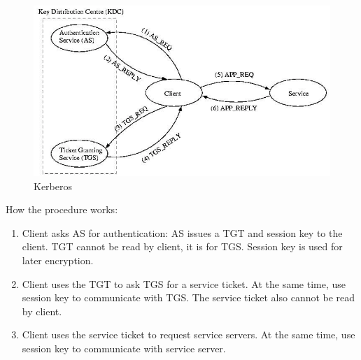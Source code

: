 \begin{figure}
\centering
\includegraphics[width=\textwidth]{img/ch06-kerberos.png}
\caption{Kerberos}
\label{fig:ch06-kerberos}
\end{figure}

How the procedure works:
\begin{enumerate}
    \item Client asks AS for authentication: AS issues a TGT and session key to the client. TGT cannot be read by client, it is for TGS. Session key is used for later encryption. 
    \item Client uses the TGT to ask TGS for a service ticket. At the same time, use session key to communicate with TGS. The service ticket also cannot be read by client.
    \item Client uses the service ticket to request service servers. At the same time, use session key to communicate with service server.
\end{enumerate}